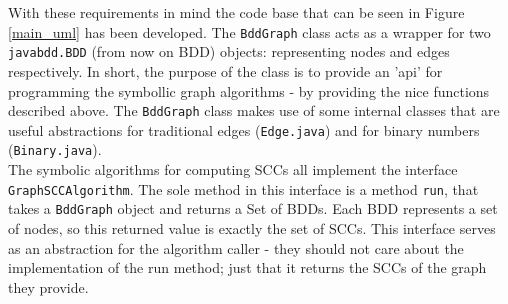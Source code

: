 \documentclass[../master/master.tex]{subfiles}
\begin{document}
With these requirements in mind the code base that can be seen in Figure \ref{main_uml} has been developed. The \texttt{BddGraph} class acts as a wrapper for two \texttt{javabdd.BDD} (from now on BDD) objects: representing nodes and edges respectively. In short, the purpose of the class is to provide an 'api' for programming the symbollic graph algorithms - by providing the nice functions described above. The \texttt{BddGraph} class makes use of some internal classes that are useful abstractions for traditional edges (\texttt{Edge.java}) and for binary numbers (\texttt{Binary.java}).\\

The symbolic algorithms for computing SCCs all implement the interface \texttt{GraphSCCAlgorithm}. The sole method in this interface is a method \texttt{run}, that takes a \texttt{BddGraph} object and returns a Set of BDDs. Each BDD represents a set of nodes, so this returned value is exactly the set of SCCs. This interface serves as an abstraction for the algorithm caller - they should not care about the implementation of the run method; just that it returns the SCCs of the graph they provide.
\end{document}
